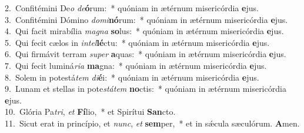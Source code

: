 {2.~}Confitémini De\textit{o} \textit{de}\textbf{ó}rum:~* quóniam in ætérnum misericórdia \textbf{e}jus.\\
{3.~}Confitémini Dómino \textit{do}\textit{mi}\textbf{nó}rum:~* quóniam in ætérnum misericórdia \textbf{e}jus.\\
{4.~}Qui facit mirabília \textit{ma}\textit{gna} \textbf{so}lus:~* quóniam in ætérnum misericórdia \textbf{e}jus.\\
{5.~}Qui fecit cælos in \textit{in}\textit{tel}\textbf{lé}ctu:~* quóniam in ætérnum misericórdia \textbf{e}jus.\\
{6.~}Qui firmávit terram \textit{su}\textit{per} \textbf{a}quas:~* quóniam in ætérnum misericórdia \textbf{e}jus.\\
{7.~}Qui fecit luminá\textit{ri}\textit{a} \textbf{ma}gna:~* quóniam in ætérnum misericórdia \textbf{e}jus.\\
{8.~}Solem in potestá\textit{tem} \textit{di}\textbf{é}i:~* quóniam in ætérnum misericórdia \textbf{e}jus.\\
{9.~}Lunam et stellas in pote\textit{stá}\textit{tem} \textbf{no}ctis:~* quóniam in ætérnum misericórdia \textbf{e}jus.\\
{10.~}Glória Pa\textit{tri}, \textit{et} \textbf{Fí}lio,~* et Spirítui \textbf{San}cto.\\
{11.~}Sicut erat in princípio, et \textit{nunc}, \textit{et} \textbf{sem}per,~* et in sǽcula sæculórum. \textbf{A}men.\\
